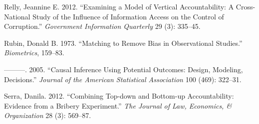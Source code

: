\documentclass[]{AEA}
\newlength{\cslhangindent}
\newlength{\cslentryspacingunit} %
\newenvironment{CSLReferences}[2] %
 {%
  \setlength{\parindent}{0pt}
  \ifodd #1
  \let\oldpar\par
  \def\par{\hangindent=\cslhangindent\oldpar}
  \fi
  \setlength{\parskip}{#2\cslentryspacingunit}
 }%
 {}
\begin{document}
\begin{CSLReferences}{1}{0}
\leavevmode{}%
Relly, Jeannine E. 2012. {``Examining a Model of Vertical
Accountability: {A} Cross-National Study of the Influence of Information
Access on the Control of Corruption.''} \emph{Government Information
Quarterly} 29 (3): 335--45.

\leavevmode{}%
Rubin, Donald B. 1973. {``Matching to Remove Bias in Observational
Studies.''} \emph{Biometrics}, 159--83.

\leavevmode{}%
---------. 2005. {``Causal Inference Using Potential Outcomes: {Design},
Modeling, Decisions.''} \emph{Journal of the American Statistical
Association} 100 (469): 322--31.

\leavevmode{}%
Serra, Danila. 2012. {``Combining Top-down and Bottom-up Accountability:
Evidence from a Bribery Experiment.''} \emph{The Journal of Law,
Economics, \& Organization} 28 (3): 569--87.

\end{CSLReferences}
\end{document}
